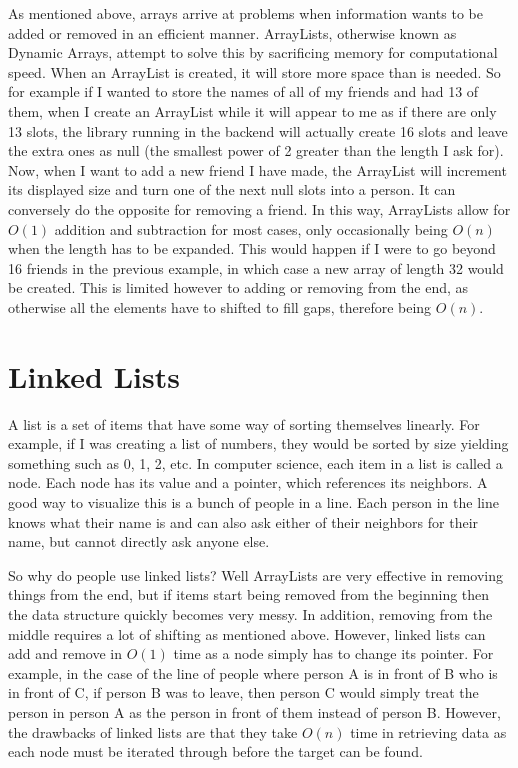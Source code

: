 As mentioned above, arrays arrive at problems when information wants to be added or removed in an efficient manner. ArrayLists, otherwise known as Dynamic Arrays, attempt to solve this by sacrificing memory for computational speed. When an ArrayList is created, it will store more space than is needed. So for example if I wanted to store the names of all of my friends and had 13 of them, when I create an ArrayList while it will appear to me as if there are only 13 slots, the library running in the backend will actually create 16 slots and leave the extra ones as null (the smallest power of 2 greater than the length I ask for). Now, when I want to add a new friend I have made, the ArrayList will increment its displayed size and turn one of the next null slots into a person. It can conversely do the opposite for removing a friend. In this way, ArrayLists allow for $O(1)$ addition and subtraction for most cases, only occasionally being $O(n)$ when the length has to be expanded. This would happen if I were to go beyond 16 friends in the previous example, in which case a new array of length 32 would be created. This is limited however to adding or removing from the end, as otherwise all the elements have to shifted to fill gaps, therefore being $O(n)$.

\section{Linked Lists}

A list is a set of items that have some way of sorting themselves linearly. For example, if I was creating a list of numbers, they would be sorted by size yielding something such as 0, 1, 2, etc. In computer science, each item in a list is called a node. Each node has its value and a pointer, which references its neighbors. A good way to visualize this is a bunch of people in a line. Each person in the line knows what their name is and can also ask either of their neighbors for their name, but cannot directly ask anyone else.

So why do people use linked lists? Well ArrayLists are very effective in removing things from the end, but if items start being removed from the beginning then the data structure quickly becomes very messy. In addition, removing from the middle requires a lot of shifting as mentioned above. However, linked lists can add and remove in $O(1)$ time as a node simply has to change its pointer. For example, in the case of the line of people where person A is in front of B who is in front of C, if person B was to leave, then person C would simply treat the person in person A as the person in front of them instead of person B. However, the drawbacks of linked lists are that they take $O(n)$ time in retrieving data as each node must be iterated through before the target can be found.


